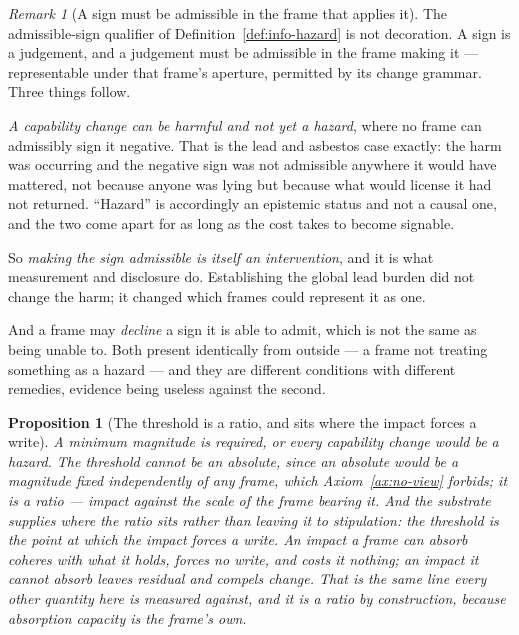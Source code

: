 \documentclass[11pt,a4paper]{article}
\newtheorem{proposition}[definition]{Proposition}
\theoremstyle{remark}\newtheorem{remark}[definition]{Remark}
\begin{document}
\begin{remark}[A sign must be admissible in the frame that applies it]\label{rem:admissible-sign}
The admissible-sign qualifier of Definition~\ref{def:info-hazard} is not decoration. A sign is a judgement, and a judgement must be admissible in the frame
making it --- representable under that frame's aperture, permitted by its change grammar. Three things
follow.

\emph{A capability change can be harmful and not yet a hazard}, where no frame can admissibly sign it
negative. That is the lead and asbestos case exactly: the harm was occurring and the negative sign was
not admissible anywhere it would have mattered, not because anyone was lying but because what would
license it had not returned. ``Hazard'' is accordingly an epistemic status and not a causal one, and
the two come apart for as long as the cost takes to become signable.

So \emph{making the sign admissible is itself an intervention}, and it is what measurement and
disclosure do. Establishing the global lead burden did not change the harm; it changed which frames
could represent it as one.

And a frame may \emph{decline} a sign it is able to admit, which is not the same as being unable to.
Both present identically from outside --- a frame not treating something as a hazard --- and they are
different conditions with different remedies, evidence being useless against the second.
\end{remark}

\begin{proposition}[The threshold is a ratio, and sits where the impact forces a write]\label{prop:hazard-threshold}
A minimum magnitude is required, or every capability change would be a hazard. The threshold cannot be
an absolute, since an absolute would be a magnitude fixed independently of any frame, which
Axiom~\ref{ax:no-view} forbids; it is a ratio --- impact against the scale of the frame bearing it.
And the substrate supplies where the ratio sits rather than leaving it to stipulation:
\emph{the threshold is the point at which the impact forces a write}. An impact a frame can absorb
coheres with what it holds, forces no write, and costs it nothing; an impact it cannot absorb leaves
residual and compels change. That is the same line every other quantity here is measured against, and
it is a ratio by construction, because absorption capacity is the frame's own.
\end{proposition}
\end{document}
